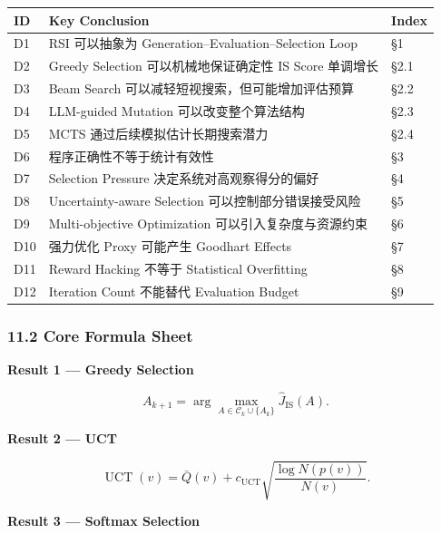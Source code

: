 \begin{readertable}
\begin{longtable}[]{@{}
  >{\raggedright\arraybackslash}p{}
  >{\raggedright\arraybackslash}p{}
  >{\raggedright\arraybackslash}p{}@{}}
\toprule
ID & Key Conclusion & Index \\
\midrule
\endhead
D1 & RSI 可以抽象为 Generation--Evaluation--Selection Loop & §1 \\
D2 & Greedy Selection 可以机械地保证确定性 IS Score 单调增长 & §2.1 \\
D3 & Beam Search 可以减轻短视搜索，但可能增加评估预算 & §2.2 \\
D4 & LLM-guided Mutation 可以改变整个算法结构 & §2.3 \\
D5 & MCTS 通过后续模拟估计长期搜索潜力 & §2.4 \\
D6 & 程序正确性不等于统计有效性 & §3 \\
D7 & Selection Pressure 决定系统对高观察得分的偏好 & §4 \\
D8 & Uncertainty-aware Selection 可以控制部分错误接受风险 & §5 \\
D9 & Multi-objective Optimization 可以引入复杂度与资源约束 & §6 \\
D10 & 强力优化 Proxy 可能产生 Goodhart Effects & §7 \\
D11 & Reward Hacking 不等于 Statistical Overfitting & §8 \\
D12 & Iteration Count 不能替代 Evaluation Budget & §9 \\
\bottomrule
\end{longtable}
\end{readertable}

\hypertarget{part-3-40-0001-core-formula-sheet}{%
\subsubsection{11.2 Core Formula Sheet}\label{part-3-40-0001-core-formula-sheet}}

\textbf{Result 1 --- Greedy Selection}

\[A_{k+1}
=
\arg\max_{A\in\mathcal C_k\cup\{A_k\}}
\widehat J_{\mathrm{IS}}(A).\]

\textbf{Result 2 --- UCT}

\[\operatorname{UCT}(v)
=
\bar Q(v)+c_{\mathrm{UCT}}
\sqrt{\frac{\log N(p(v))}{N(v)}}.\]

\textbf{Result 3 --- Softmax Selection}

